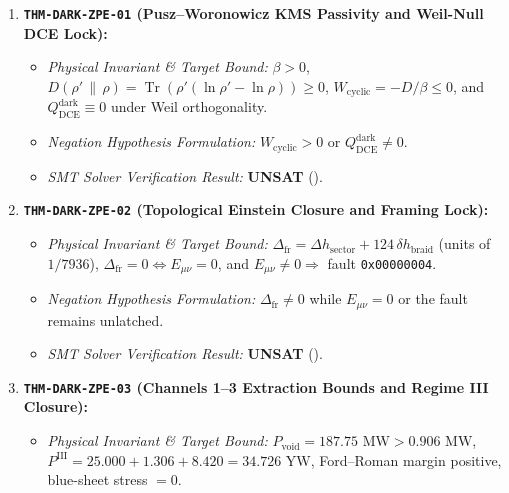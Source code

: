 \documentclass[11pt,onecolumn]{article}
\DeclareMathOperator{\Tr}{Tr}
\begin{document}
\begin{enumerate}
\begin{itemize}
        \item \emph{Negation Hypothesis Formulation:} Nonzero visible Stinespring partition, nonzero bulk volume or collision cross-section, nonzero internal dissipation, or finite open-loop grid depletion after pinch-off.
        \item \emph{SMT Solver Verification Result:} \textbf{UNSAT} ().
    \end{itemize}
    \item \textbf{\texttt{THM-DARK-ZPE-01} (Pusz--Woronowicz KMS Passivity and Weil-Null DCE Lock):}
    \begin{itemize}
        \item \emph{Physical Invariant \& Target Bound:} $\beta>0$, $D(\rho'\,\|\,\rho)=\Tr(\rho'(\ln\rho'-\ln\rho))\ge0$, $W_{\text{cyclic}}=-D/\beta\le0$, and $Q_{\text{DCE}}^{\text{dark}}\equiv0$ under Weil orthogonality.
        \item \emph{Negation Hypothesis Formulation:} $W_{\text{cyclic}}>0$ or $Q_{\text{DCE}}^{\text{dark}}\neq0$.
        \item \emph{SMT Solver Verification Result:} \textbf{UNSAT} ().
    \end{itemize}
    \item \textbf{\texttt{THM-DARK-ZPE-02} (Topological Einstein Closure and Framing Lock):}
    \begin{itemize}
        \item \emph{Physical Invariant \& Target Bound:} $\Delta_{\text{fr}}=\Delta h_{\text{sector}}+124\,\delta h_{\text{braid}}$ (units of $1/7936$), $\Delta_{\text{fr}}=0\iff E_{\mu\nu}=0$, and $E_{\mu\nu}\neq0\Rightarrow$ fault \texttt{0x00000004}.
        \item \emph{Negation Hypothesis Formulation:} $\Delta_{\text{fr}}\neq0$ while $E_{\mu\nu}=0$ or the fault remains unlatched.
        \item \emph{SMT Solver Verification Result:} \textbf{UNSAT} ().
    \end{itemize}
    \item \textbf{\texttt{THM-DARK-ZPE-03} (Channels 1--3 Extraction Bounds and Regime III Closure):}
    \begin{itemize}
        \item \emph{Physical Invariant \& Target Bound:} $P_{\text{void}}=187.75\text{ MW}>0.906\text{ MW}$, $P^{\text{III}}=25.000+1.306+8.420=34.726\text{ YW}$, Ford--Roman margin positive, blue-sheet stress $=0$.

\end{itemize}
\end{enumerate}
\end{document}
